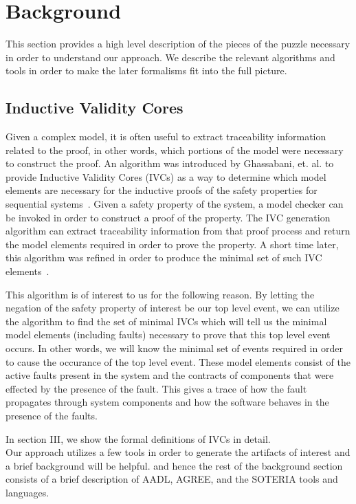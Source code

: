\section{Background}
This section provides a high level description of the pieces of the puzzle necessary in order to understand our approach. We describe the relevant algorithms and tools in order to make the later formalisms fit into the full picture. 

\subsection{Inductive Validity Cores}

Given a complex model, it is often useful to extract traceability information related to the proof, in other words, which portions of the model were necessary to construct the proof. An algorithm was introduced by Ghassabani, et. al. to provide Inductive Validity Cores (IVCs) as a way to determine which model elements are necessary for the inductive proofs of the safety properties for sequential systems~\cite{GhassabaniGW16}. Given a safety property of the system, a model checker can be invoked in order to construct a proof of the property. The IVC generation algorithm can extract traceability information from that proof process and return the model elements required in order to prove the property. A short time later, this algorithm was refined in order to produce the minimal set of such IVC elements~\cite{Ghassabani2017EfficientGO}. 

This algorithm is of interest to us for the following reason. By letting the negation of the safety property of interest be our top level event, we can utilize the algorithm to find the set of minimal IVCs which will tell us the minimal model elements (including faults) necessary to prove that this top level event occurs. In other words, we will know the minimal set of events required in order to cause the occurance of the top level event. These model elements consist of the active faults present in the system and the contracts of components that were effected by the presence of the fault. This gives a trace of how the fault propagates through system components and how the software behaves in the presence of the faults. 

In section III, we show the formal definitions of IVCs in detail. \\

Our approach utilizes a few tools in order to generate the artifacts of interest and a brief background will be helpful. and hence the rest of the background section consists of a brief description of AADL, AGREE, and the SOTERIA tools and languages. 

